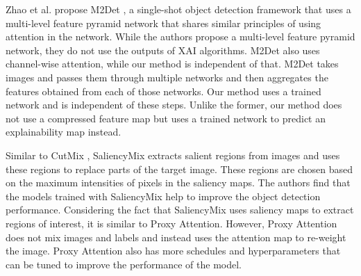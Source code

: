 Zhao et al. propose M2Det \cite{zhaoM2DetSingleShotObject2019}, a single-shot object detection framework that uses a multi-level feature pyramid network that shares similar principles of using attention in the network. While the authors propose a multi-level feature pyramid network, they do not use the outputs of XAI algorithms. M2Det also uses channel-wise attention, while our method is independent of that. M2Det takes images and passes them through multiple networks and then aggregates the features obtained from each of those networks. Our method uses a trained network and is independent of these steps. Unlike the former, our method does not use a compressed feature map but uses a trained network to predict an explainability map instead.

Similar to CutMix \cite{yunCutMixRegularizationStrategy2019}, SaliencyMix \cite{uddinSaliencyMixSaliencyGuided2021} extracts salient regions from images and uses these regions to replace parts of the target image. These regions are chosen based on the maximum intensities of pixels in the saliency maps. The authors find that the models trained with SaliencyMix help to improve the object detection performance. Considering the fact that SaliencyMix uses saliency maps to extract regions of interest, it is similar to Proxy Attention. However, Proxy Attention does not mix images and labels and instead uses the attention map to re-weight the image. Proxy Attention also has more schedules and hyperparameters that can be tuned to improve the performance of the model.

